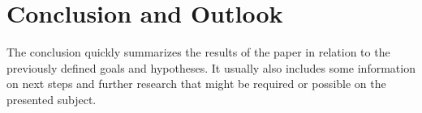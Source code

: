 \chapter{Conclusion and Outlook}
The conclusion quickly summarizes the results of the paper in relation to the previously defined goals and hypotheses. 
It usually also includes some information on next steps and further research that might be required or possible on the presented subject.
